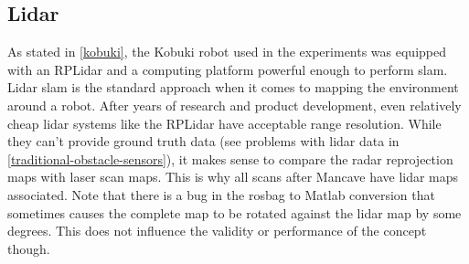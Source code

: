 \subsection{Lidar}\label{lidar-1}
As stated in \cref{kobuki}, the Kobuki robot used in the experiments was equipped with an RPLidar and a computing platform powerful enough to perform slam. Lidar slam is the standard approach when it comes to mapping the environment around a robot. After years of research and product development, even relatively cheap lidar systems like the RPLidar have acceptable range resolution. While they can't provide ground truth data (see problems with lidar data in \cref{traditional-obstacle-sensors}), it makes sense to compare the radar reprojection maps with laser scan maps. This is why all scans after Mancave have lidar maps associated.
Note that there is a bug in the rosbag to Matlab conversion that sometimes causes the complete map to be rotated against the lidar map by some degrees. This does not influence the validity or performance of the concept though.
